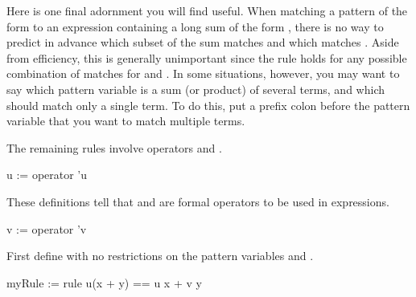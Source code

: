 {Here is one final adornment you will find useful.
When matching a pattern of the form  to an expression containing a
long sum of the form , there is no way to predict in
advance which subset of the sum  matches  and which matches
.
Aside from efficiency, this is generally unimportant since the rule holds for
any possible combination of matches for  and .
In some situations, however, you may want to say which pattern variable is a sum
(or product) of several terms, and which should match only a single term.
To do this, put a prefix colon \spadSyntax{:} before the pattern variable
that you want to match multiple terms.
%
\begin{xtc}
\begin{xtccomment}
The remaining rules involve operators  and .
\end{xtccomment}
\begin{spadsrc}
u := operator 'u 
\end{spadsrc}
\begin{TeXOutput}
\begin{fricasmath}{20}
%
\end{fricasmath}
\end{TeXOutput}
\end{xtc}
\begin{xtc}
\begin{xtccomment}
These definitions tell \Language{} that
 and  are formal operators to be used in expressions.
\end{xtccomment}
\begin{spadsrc}
v := operator 'v 
\end{spadsrc}
\begin{TeXOutput}
\begin{fricasmath}{21}
%
\end{fricasmath}
\end{TeXOutput}
\end{xtc}
\begin{xtc}
\begin{xtccomment}
First define 
with no restrictions on the pattern variables
 and .
\end{xtccomment}
\begin{spadsrc}
myRule := rule u(x + y) == u x + v y 
\end{spadsrc}
\begin{TeXOutput}

\end{TeXOutput}
\end{xtc}}
